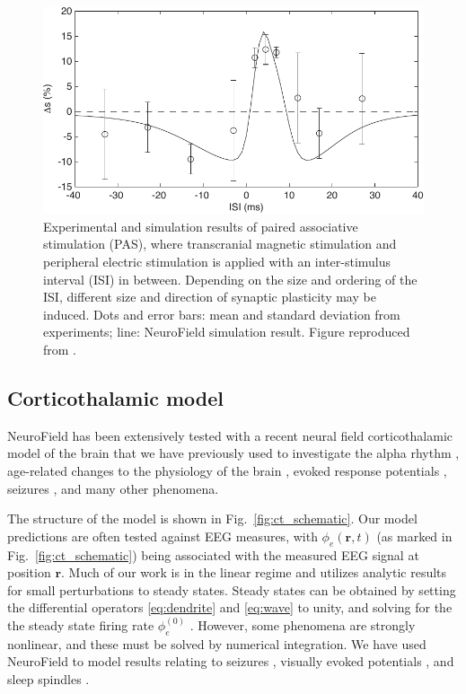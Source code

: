 \documentclass[preprint,review,10pt,authoryear,letterpaper]{elsarticle}
\begin{document}
\begin{figure}[t]
\begin{center}
\includegraphics[width=.8\textwidth]{window}
\caption{Experimental and simulation results of paired associative stimulation (PAS), where transcranial magnetic stimulation and peripheral electric stimulation is applied with an inter-stimulus interval (ISI) in between. Depending on the size and ordering of the ISI, different size and direction of synaptic plasticity may be induced. Dots and error bars: mean and standard deviation from experiments; line: NeuroField simulation result. Figure reproduced from \citet{fung13}.}
\label{fig:cadp-window}
\end{center}
\end{figure}

\clearpage

\subsection{Corticothalamic model}
\label{sec:ct}

NeuroField has been extensively tested with a recent neural field corticothalamic model of the brain \citep{Robinson2005,Rowe2004413,PhysRevE.63.021903,PhysRevE.65.041924,Robinson:04aa} that we have previously used to investigate the alpha rhythm \citep{PhysRevE.68.021922,PhysRevE.70.011911}, age-related changes to the physiology of the brain \citep{VanAlbada2010}, evoked response potentials \citep{Rennie2002,ker11}, seizures \citep{Breakspear2006}, and many other phenomena. 

The structure of the model is shown in Fig.~\ref{fig:ct_schematic}. 
Our model predictions are often tested against EEG measures, with $\phi_e(\mathbf{r},t)$ (as marked in Fig.~\ref{fig:ct_schematic}) being associated with the measured EEG signal at position $\mathbf{r}$. 
Much of our work is in the linear regime and utilizes analytic results for small perturbations to steady states. Steady states can be obtained by setting the differential operators \eqref{eq:dendrite} and \eqref{eq:wave} to unity, and solving for the the steady state firing rate $\phi_e^{(0)}$ \cite{Robinson:04aa}. 
However, some phenomena are strongly nonlinear, and these must be solved by numerical integration. We have used NeuroField to model results relating to seizures \citep{Roberts2008}, visually evoked potentials \citep{Roberts2012a}, and sleep spindles \citep{Abeysuriya2013,Abeysuriya2013a}.  
\end{document}
